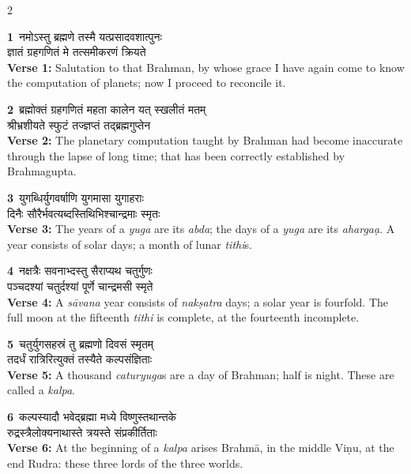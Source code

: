 \documentclass[11pt,a4paper]{article}
\newcommand{\dev}[1]{{\devanagarifont #1}}
\newcommand{\iast}[1]{\textit{#1}}
\newcommand{\vnum}[1]{\textcolor{versenumbercolor}{\textbf{#1}}}
\begin{document}
\begin{paracol}{2}

\switchcolumn[0]
\vnum{1}\ \dev{नमोऽस्तु ब्रह्मणे तस्मै यत्प्रसादवशात्पुनः}\\
\dev{ज्ञातं ग्रहगणितं मे तत्समीकरणं क्रियते}\\
\switchcolumn[1]
\textbf{Verse 1:} Salutation to that Brahman, by whose grace I have again come to know the computation of planets; now I proceed to reconcile it.

\switchcolumn[0]
\vnum{2}\ \dev{ब्रह्मोक्तं ग्रहगणितं महता कालेन यत् स्खलीतं मतम्}\\
\dev{श्रीभ्रशीयते स्फुटं तज्ज्ञप्तं तद्ब्रह्मगुप्तेन}\\
\switchcolumn[1]
\textbf{Verse 2:} The planetary computation taught by Brahman had become inaccurate through the lapse of long time; that has been correctly established by Brahmagupta.

\switchcolumn[0]
\vnum{3}\ \dev{युगब्धिर्युगवर्षाणि युगमासा युगाहराः}\\
\dev{दिनैः सौरैर्भवत्यब्दस्तिथिभिश्चान्द्रमाः स्मृतः}\\
\switchcolumn[1]
\textbf{Verse 3:} The years of a \iast{yuga} are its \iast{abda}; the days of a \iast{yuga} are its \iast{aharga\d a}. A year consists of solar days; a month of lunar \iast{tithi}s.

\switchcolumn[0]
\vnum{4}\ \dev{नक्षत्रैः सवनाभ्दस्तु सैराप्यथ चतुर्गुणः}\\
\dev{पञ्चदश्यां चतुर्दश्यां पूर्णे चान्द्रमसी स्मृते}\\
\switchcolumn[1]
\textbf{Verse 4:} A \iast{s\=avana} year consists of \iast{nak\d satra} days; a solar year is fourfold. The full moon at the fifteenth \iast{tithi} is complete, at the fourteenth incomplete.

\switchcolumn[0]
\vnum{5}\ \dev{चतुर्युगसहस्रं तु ब्रह्मणो दिवसं स्मृतम्}\\
\dev{तदर्धं रात्रिरित्युक्तं तस्यैते कल्पसंज्ञिताः}\\
\switchcolumn[1]
\textbf{Verse 5:} A thousand \iast{caturyuga}s are a day of Brahman; half is night. These are called a \iast{kalpa}.

\switchcolumn[0]
\vnum{6}\ \dev{कल्पस्यादौ भवेद्ब्रह्मा मध्ये विष्णुस्तथान्तके}\\
\dev{रुद्रस्त्रैलोक्यनाथास्ते त्रयस्ते संप्रकीर्तिताः}\\
\switchcolumn[1]
\textbf{Verse 6:} At the beginning of a \iast{kalpa} arises Brahm\=a, in the middle Vi\d nu, at the end Rudra: these three lords of the three worlds.


\end{paracol}
\end{document}
